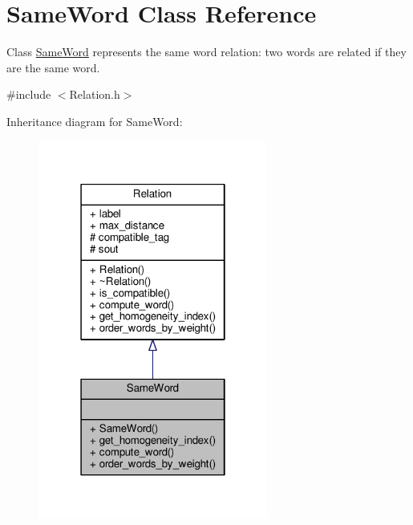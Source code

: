 \hypertarget{classSameWord}{}\section{Same\+Word Class Reference}
\label{classSameWord}


Class \hyperlink{classSameWord}{Same\+Word} represents the same word relation\+: two words are related if they are the same word.  




{\ttfamily \#include $<$Relation.\+h$>$}



Inheritance diagram for Same\+Word\+:\nopagebreak
\begin{figure}[H]
\begin{center}
\leavevmode
\includegraphics[width=214pt]{classSameWord__inherit__graph}
\end{center}
\end{figure}


